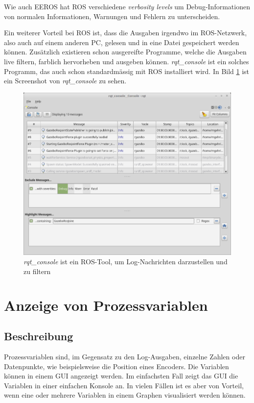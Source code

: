 Wie auch EEROS hat ROS verschiedene \textit{verbosity levels} um Debug-Informationen von normalen Informationen, Warnungen und Fehlern zu unterscheiden.

Ein weiterer Vorteil bei ROS ist, dass die Ausgaben irgendwo im ROS-Netzwerk, also auch auf einem anderen PC, gelesen und in eine Datei gespeichert werden können.
Zusätzlich existieren schon ausgereifte Programme, welche die Ausgaben live filtern, farblich hervorheben und ausgeben können.
\textit{rqt\_console} ist ein solches Programm, das auch schon standardmässig mit ROS installiert wird.
In Bild \ref{fig:rqtConsole} ist ein Screenshot von \textit{rqt\_console} zu sehen.

\begin{figure}[!ht]
\centering
\includegraphics[angle=0,width=\textwidth]{images/screenshotRqtConsole.png}
\caption{\textit{rqt\_console} ist ein ROS-Tool, um Log-Nachrichten darzustellen und zu filtern}
\label{fig:rqtConsole}
\end{figure}


\section{Anzeige von Prozessvariablen}
\subsection{Beschreibung}
Prozessvariablen sind, im Gegensatz zu den Log-Ausgaben, einzelne Zahlen oder Datenpunkte, wie beispielsweise die Position eines Encoders.
Die Variablen können in einem GUI angezeigt werden.
Im einfachsten Fall zeigt das GUI die Variablen in einer einfachen Konsole an.
In vielen Fällen ist es aber von Vorteil, wenn eine oder mehrere Variablen in einem Graphen visualisiert werden können.

